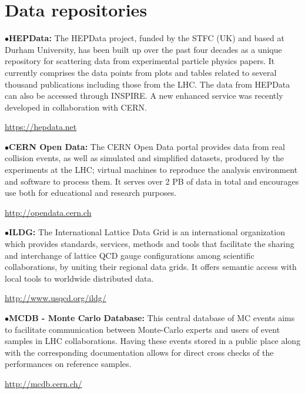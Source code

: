 
\section{Data repositories}  %

\medskip



\item{$\bullet$}{\bf HEPData:} 
The HEPData project, funded by the STFC (UK) and based at Durham University, has been built up over the past four decades as a unique repository for scattering data from experimental particle physics papers.
It currently comprises the data points from plots and tables related to several thousand publications including those from the LHC.
The data from HEPData can also be accessed through INSPIRE. A new enhanced service was recently developed in collaboration with CERN.
	\item{}\qquad\url{https://hepdata.net}
\medskip

\item{$\bullet$}{\bf CERN Open Data:} 
The CERN Open Data portal provides data from real collision events, as well as simulated and simplified datasets, produced by the experiments at the LHC; virtual machines to reproduce the analysis environment and software to process them. It serves over 2 PB of data in total and encourages use both for educational and research purposes.

	\item{}\qquad\url{http://opendata.cern.ch}
\medskip

\item{$\bullet$}{\bf ILDG:} 
The International Lattice Data Grid is an international organization which provides standards, services, methods and tools that facilitate the sharing and interchange of lattice QCD gauge configurations among scientific collaborations, by uniting their regional data grids. It offers semantic access with local tools to worldwide distributed data.
	\item{}\qquad\url{http://www.usqcd.org/ildg/}

\medskip

\item{$\bullet$}{\bf MCDB - Monte Carlo Database:} 
This central database of MC events aims to facilitate communication between Monte-Carlo experts and users of event samples in LHC collaborations. Having these events stored in a public place along with the corresponding documentation allows for direct cross checks of the performances on reference samples.
	\item{}\qquad\url{http://mcdb.cern.ch/}

